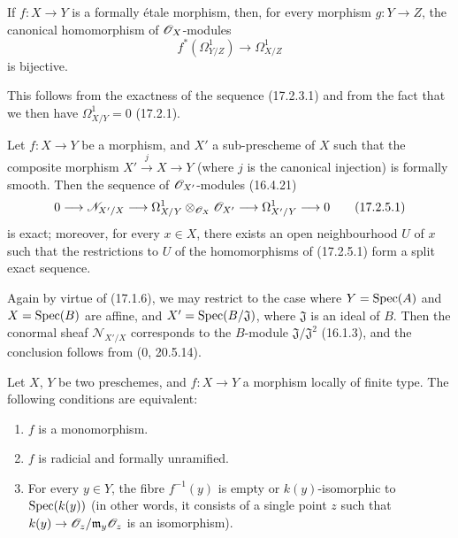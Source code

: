 \begin{corollary}[17.2.4]
\label{IV.17.2.4}
If $f:X\to Y$ is a formally étale morphism, then, for every morphism $g:Y\to Z$, the canonical homomorphism of $\mathscr{O}_X$-modules
\[
  f^*(\Omega_{Y/Z}^1)\longrightarrow\Omega_{X/Z}^1
\]
is bijective.
\end{corollary}

This follows from the exactness of the sequence (17.2.3.1) and from the fact that we then have $\Omega_{X/Y}^1=0$ (17.2.1).

\begin{proposition}[17.2.5]
\label{IV.17.2.5}
Let $f:X\to Y$ be a morphism, and $X'$ a sub-prescheme of $X$ such that the composite morphism $X'\xrightarrow{j}X\to Y$ (where $j$ is the canonical injection) is formally smooth. Then the sequence of $\mathscr{O}_{X'}$-modules (16.4.21)
\[
\label{IV.17.2.5.1}
  0\longrightarrow\mathscr{N}_{X'/X}\longrightarrow\Omega_{X/Y}^1\otimes_{\mathscr{O}_X}\mathscr{O}_{X'}\longrightarrow\Omega_{X'/Y}^1\longrightarrow0
  \tag{17.2.5.1}
\]
is exact; moreover, for every $x\in X$, there exists an open neighbourhood $U$ of $x$ such that the restrictions to $U$ of the homomorphisms of (17.2.5.1) form a split exact sequence.
\end{proposition}

Again by virtue of (17.1.6), we may restrict to the case where $Y=\operatorname{Spec}(A)$ and $X=\operatorname{Spec}(B)$ are affine, and $X'=\operatorname{Spec}(B/\mathfrak{J})$, where $\mathfrak{J}$ is an ideal of $B$. Then the conormal sheaf $\mathcal{N}_{X'/X}$ corresponds to the $B$-module $\mathfrak{J}/\mathfrak{J}^2$ (16.1.3), and the conclusion follows from (0, 20.5.14).

\begin{proposition}[17.2.6]
\label{IV.17.2.6}
Let $X$, $Y$ be two preschemes, and $f:X\to Y$ a morphism locally of finite type. The following conditions are equivalent:
\begin{enumerate}
  \item[a)] $f$ is a monomorphism.
  \item[b)] $f$ is radicial and formally unramified.
  \item[c)] For every $y\in Y$, the fibre $f^{-1}(y)$ is empty or $k(y)$-isomorphic to $\operatorname{Spec}(k(y))$ (in other words, it consists of a single point $z$ such that $k(y)\to\mathscr{O}_z/\mathfrak{m}_y\mathscr{O}_z$ is an isomorphism).
\end{enumerate}
\end{proposition}


